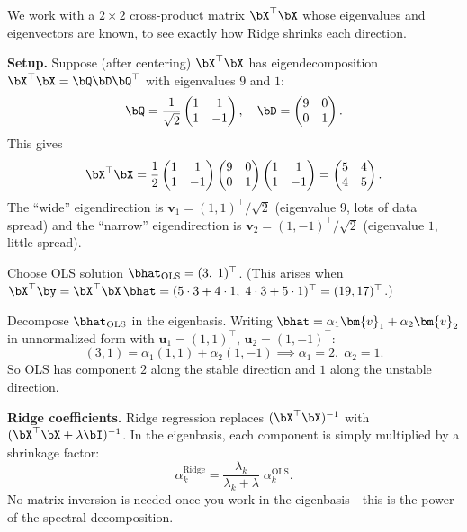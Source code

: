 \begin{example}\label{ex:ridge}
We work with a $2\times 2$ cross-product matrix $\bX^\top\bX$ whose eigenvalues
and eigenvectors are known, to see exactly how Ridge shrinks each direction.

\medskip\noindent\textbf{Setup.}
Suppose (after centering) $\bX^\top\bX$ has eigendecomposition
$\bX^\top\bX = \bQ\bD\bQ^\top$ with eigenvalues $9$ and $1$:
\[
\bQ = \frac{1}{\sqrt{2}}\begin{pmatrix}1&1\\1&-1\end{pmatrix},\quad
\bD = \begin{pmatrix}9&0\\0&1\end{pmatrix}.
\]
This gives
\[
\bX^\top\bX
= \frac{1}{2}\begin{pmatrix}1&1\\1&-1\end{pmatrix}
\begin{pmatrix}9&0\\0&1\end{pmatrix}
\begin{pmatrix}1&1\\1&-1\end{pmatrix}
= \begin{pmatrix}5&4\\4&5\end{pmatrix}.
\]
The ``wide'' eigendirection is $\bm{v}_1 = (1,1)^\top/\sqrt{2}$ (eigenvalue $9$, lots of data spread)
and the ``narrow'' eigendirection is $\bm{v}_2 = (1,-1)^\top/\sqrt{2}$ (eigenvalue $1$, little spread).

Choose OLS solution $\bhat_{\text{OLS}} = (3,\;1)^\top$.
(This arises when $\bX^\top\by = \bX^\top\bX\,\bhat = (5\cdot3+4\cdot1,\;4\cdot3+5\cdot1)^\top = (19,17)^\top$.)

Decompose $\bhat_{\text{OLS}}$ in the eigenbasis. Writing $\bhat = \alpha_1\bm{v}_1 + \alpha_2\bm{v}_2$
in unnormalized form with $\bm{u}_1 = (1,1)^\top$, $\bm{u}_2 = (1,-1)^\top$:
\[
(3,1) = \alpha_1(1,1) + \alpha_2(1,-1) \implies \alpha_1 = 2,\;\alpha_2 = 1.
\]
So OLS has component $2$ along the stable direction and $1$ along the unstable direction.

\medskip\noindent\textbf{Ridge coefficients.}
Ridge regression replaces $(\bX^\top\bX)^{-1}$ with $(\bX^\top\bX + \lambda\bI)^{-1}$.
In the eigenbasis, each component is simply multiplied by a shrinkage factor:
\[
\alpha_k^{\text{Ridge}} = \frac{\lambda_k}{\lambda_k + \lambda}\;\alpha_k^{\text{OLS}}.
\]
No matrix inversion is needed once you work in the eigenbasis---this is the power
of the spectral decomposition.


\end{example}
